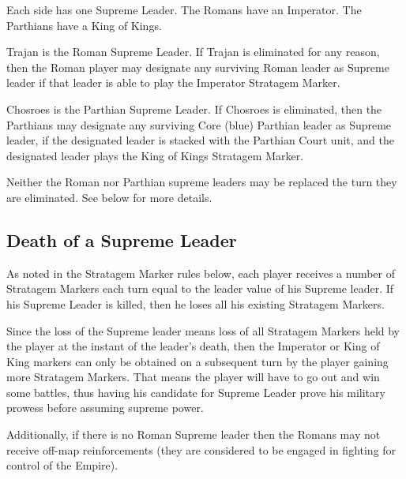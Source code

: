 Each side has one Supreme Leader. The Romans have an Imperator. The Parthians have a King of Kings.

Trajan is the Roman Supreme Leader. If Trajan is eliminated for any reason, then the Roman player may designate any surviving Roman leader as Supreme leader if that leader is able to play the Imperator Stratagem Marker.

Chosroes is the Parthian Supreme Leader. If Chosroes is eliminated, then the Parthians may designate any surviving Core (blue) Parthian leader as Supreme leader, if the designated leader is stacked with the Parthian Court unit, and the designated leader plays the King of Kings Stratagem Marker.

Neither the Roman nor Parthian supreme leaders may be replaced the turn they are eliminated. See below for more details.

\subsection{Death of a Supreme Leader}

As noted in the Stratagem Marker rules below, each player receives a number of Stratagem Markers each turn equal to the leader value of his Supreme leader. If his Supreme Leader is killed, then he loses all his existing Stratagem Markers.

Since the loss of the Supreme leader means loss of all Stratagem Markers held by the player at the instant of the leader's death, then the Imperator or King of King markers can only be obtained on a subsequent turn by the player gaining more Stratagem Markers. That means the player will have to go out and win some battles, thus having his candidate for Supreme Leader prove his military prowess before assuming supreme power.

Additionally, if there is no Roman Supreme leader then the Romans may not receive off-map reinforcements (they are considered to be engaged in fighting for control of the Empire).
